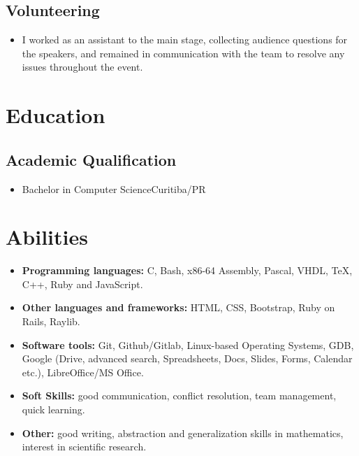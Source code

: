 \documentclass[a4paper, 12pt]{moderncv}
\begin{document}
\vspace{4pt}
\subsection{\small{Volunteering}}
\begin{itemize}
    \item{
            {\vspace{3pt}I worked as an assistant to the main stage, collecting
            audience questions for the speakers, and remained in communication
            with the team to resolve any issues throughout the event.}}
        \vspace{4pt}
\end{itemize}
\vspace{4pt}

\section{Education}
\vspace{1pt}
\subsection{\small{Academic Qualification}}
\vspace{2pt}
\begin{itemize}
    \item{
        {Bachelor in Computer Science}{Curitiba/PR}{}{}}
\end{itemize}
\vspace{4pt}

\section{Abilities}
\vspace{4pt}
\begin{itemize}
    \item{\textbf{Programming languages:} C, Bash, x86-64 Assembly, Pascal, VHDL,
        \TeX, C++, Ruby and JavaScript.}
    \vspace{4pt}
    \item{\textbf{Other languages and frameworks:} HTML, CSS, Bootstrap, Ruby on Rails,
        Raylib.}
    \vspace{4pt}
    \item{\textbf{Software tools:} Git, Github/Gitlab, Linux-based Operating Systems,
        GDB, Google (Drive, advanced search, Spreadsheets, Docs, Slides, Forms,
        Calendar etc.), LibreOffice/MS Office.}
    \vspace{4pt}
    \item{\textbf{Soft Skills:} good communication, conflict resolution, team management,
        quick learning.}
    \vspace{4pt}
    \item{\textbf{Other:} good writing, abstraction and generalization skills in
        mathematics, interest in scientific research.}
\end{itemize}
\vspace{4pt}
\end{document}
